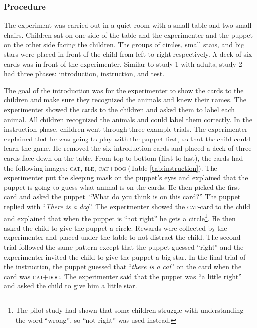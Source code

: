 \documentclass[
  english,
  ,man,floatsintext]{apa6}
\begin{document}
\hypertarget{procedure-1}{%
\subsubsection{Procedure}\label{procedure-1}}

The experiment was carried out in a quiet room with a small table and two small chairs. Children sat on one side of the table and the experimenter and the puppet on the other side facing the children. The groups of circles, small stars, and big stars were placed in front of the child from left to right respectively. A deck of six cards was in front of the experimenter. Similar to study 1 with adults, study 2 had three phases: introduction, instruction, and test.

The goal of the introduction was for the experimenter to show the cards to the children and make sure they recognized the animals and knew their names. The experimenter showed the cards to the children and asked them to label each animal. All children recognized the animals and could label them correctly. In the instruction phase, children went through three example trials. The experimenter explained that he was going to play with the puppet first, so that the child could learn the game. He removed the six introduction cards and placed a deck of three cards face-down on the table. From top to bottom (first to last), the cards had the following images: \textsc{cat}, \textsc{ele}, \textsc{cat+dog} (Table \ref{tab:instruction}). The experimenter put the sleeping mask on the puppet's eyes and explained that the puppet is going to guess what animal is on the cards. He then picked the first card and asked the puppet: \enquote{What do you think is on this card?} The puppet replied with \enquote{\emph{There is a dog}}. The experimenter showed the \textsc{cat}-card to the child and explained that when the puppet is \enquote{not right} he gets a circle\footnote{The pilot study had shown that some children struggle with understanding the word \enquote{wrong}, so \enquote{not right} was used instead.}. He then asked the child to give the puppet a circle. Rewards were collected by the experimenter and placed under the table to not distract the child. The second trial followed the same pattern except that the puppet guessed \enquote{right} and the experimenter invited the child to give the puppet a big star. In the final trial of the instruction, the puppet guessed that \enquote{\emph{there is a cat}} on the card when the card was \textsc{cat+dog}. The experimenter said that the puppet was \enquote{a little right} and asked the child to give him a little star.
\end{document}
